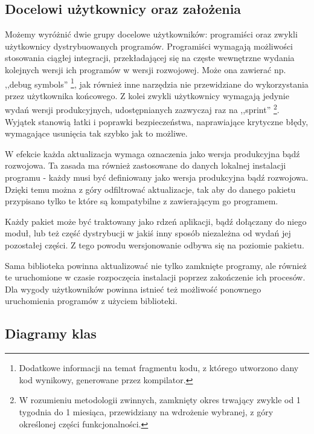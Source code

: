 \documentclass[polish,12pt,titlepage]{article}
\begin{document}
\subsection{Docelowi użytkownicy oraz założenia}

Możemy wyróżnić dwie grupy docelowe użytkowników: programiści oraz zwykli
użytkownicy dystrybuowanych programów. Programiści wymagają możliwości
stosowania ciągłej integracji, przekładającej się na częste wewnętrzne wydania
kolejnych wersji ich programów w wersji rozwojowej. Może ona zawierać np.
,,debug symbols'' \footnote{Dodatkowe informacji na temat fragmentu kodu, z
którego utworzono dany kod wynikowy, generowane przez kompilator.}, jak
również inne narzędzia nie przewidziane do wykorzystania przez użytkownika
końcowego. Z kolei zwykli użytkownicy wymagają  jedynie wydań wersji
produkcyjnych, udostępnianych zazwyczaj raz na ,,sprint'' \footnote{W
rozumieniu metodologii zwinnych, zamknięty okres trwający zwykle od 1 tygodnia 
do 1 miesiąca, przewidziany na wdrożenie wybranej, z góry określonej części
funkcjonalności.}. Wyjątek stanowią łatki i poprawki bezpieczeństwa,
naprawiające krytyczne błędy, wymagające usunięcia tak szybko jak to możliwe.

W efekcie każda aktualizacja wymaga oznaczenia jako wersja produkcyjna bądź
rozwojowa. Ta zasada ma również zastosowane do danych lokalnej instalacji
programu - każdy musi być definiowany jako wersja produkcyjna bądź rozwojowa.
Dzięki temu można z góry odfiltrować aktualizacje, tak aby do danego pakietu
przypisano tylko te które są kompatybilne z zawierającym go programem.

Każdy pakiet może być traktowany jako rdzeń aplikacji, bądź dołączany do niego
moduł, lub też część dystrybucji w jakiś inny sposób niezależna od wydań jej
pozostałej części. Z tego powodu wersjonowanie odbywa się na poziomie pakietu.

Sama biblioteka powinna aktualizować nie tylko zamknięte programy, ale również
te uruchomione w czasie rozpoczęcia instalacji poprzez zakończenie ich
procesów. Dla wygody użytkowników powinna istnieć też możliwość ponownego
uruchomienia programów z użyciem biblioteki.


\subsection{Diagramy klas}
\end{document}
